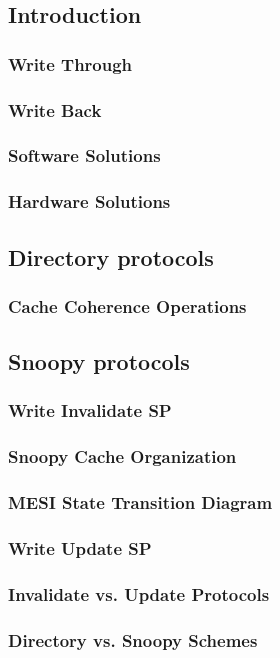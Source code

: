 \documentclass[titlepage, a4paper]{article}
\begin{document}
\subsection{Introduction}
\subsubsection{Write Through}
\subsubsection{Write Back}
\subsubsection{Software Solutions}
\subsubsection{Hardware Solutions}
\subsection{Directory protocols}
\subsubsection{Cache Coherence Operations}
\subsection{Snoopy protocols}
\subsubsection{Write Invalidate SP}
\subsubsection{Snoopy Cache Organization}
\subsubsection{MESI State Transition Diagram}
\subsubsection{Write Update SP}
\subsubsection{Invalidate vs. Update Protocols}
\subsubsection{Directory vs. Snoopy Schemes}
\end{document}
